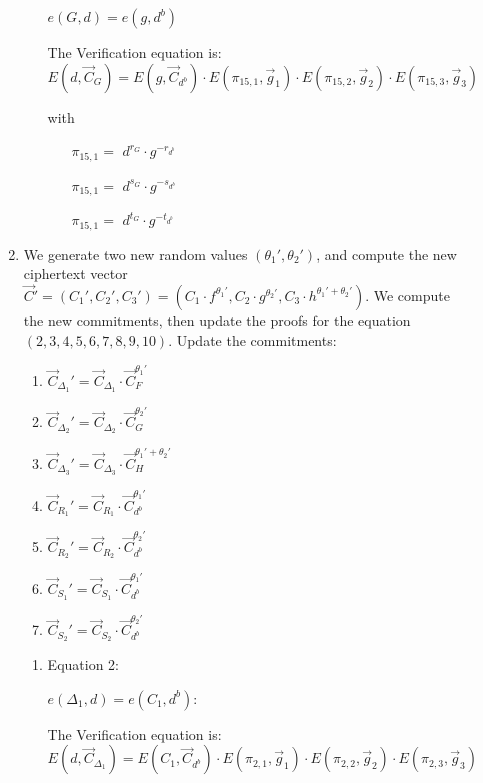 \begin{description}
\begin{enumerate}
\begin{enumerate}
      $e(\boxed{G},d) = e(g, \boxed{d^b})$

      The Verification equation is: $E(d, \vec{C}_G) = E(g, \vec{C}_{d^b}) \cdot E(\pi_{15,1}, \vec{g}_1)\cdot E(\pi_{15,2}, \vec{g}_2)\cdot E(\pi_{15,3}, \vec{g}_3)$

      with

      \begin{itemize}
      \item[$\pi_{15,1} = $] $d^{r_G} \cdot g^{-r_{d^b}}$    
      \item[$\pi_{15,1} = $] $d^{s_G} \cdot g^{-s_{d^b}}$    
      \item[$\pi_{15,1} = $] $d^{t_G} \cdot g^{-t_{d^b}}$
      \end{itemize}

    \end{enumerate}

  \item We generate two new random values $(\theta_1', \theta_2')$, and compute the new ciphertext vector $\vec{C}' = (C_1', C_2', C_3') = (C_1 \cdot f^{\theta_1'}, C_2 \cdot g^{\theta_2'}, C_3 \cdot h^{\theta_1'+\theta_2'})$. We compute the new commitments, then update the proofs for the equation $(2, 3, 4, 5, 6, 7, 8, 9, 10)$. Update the commitments:
    \begin{enumerate}
    \item $\vec{C}_{\Delta_1}' = \vec{C}_{\Delta_1} \cdot \vec{C}_{F}^{\theta_1'}$
    \item $\vec{C}_{\Delta_2}' = \vec{C}_{\Delta_2} \cdot \vec{C}_{G}^{\theta_2'}$
    \item $\vec{C}_{\Delta_3}' = \vec{C}_{\Delta_3} \cdot \vec{C}_{H}^{\theta_1' + \theta_2'}$
    \item $\vec{C}_{R_1}' = \vec{C}_{R_1} \cdot \vec{C}_{d^b}^{\theta_1'}$
    \item $\vec{C}_{R_2}' = \vec{C}_{R_2} \cdot \vec{C}_{d^b}^{\theta_2'}$
    \item $\vec{C}_{S_1}' = \vec{C}_{S_1} \cdot \vec{C}_{d^b}^{\theta_1'}$
    \item $\vec{C}_{S_2}' = \vec{C}_{S_2} \cdot \vec{C}_{d^b}^{\theta_2'}$
    \end{enumerate}
    \begin{enumerate}
    \item Equation 2:

      $e(\boxed{\Delta_1},d) = e(C_1, \boxed{d^b})$:
      
      The Verification equation is:  $E(d, \vec{C}_{\Delta_1}) = E(C_1, \vec{C}_{d^b}) \cdot E(\pi_{2,1}, \vec{g}_1)\cdot E(\pi_{2,2}, \vec{g}_2)\cdot E(\pi_{2,3}, \vec{g}_3)$
      

\end{enumerate}
\end{enumerate}
\end{description}
